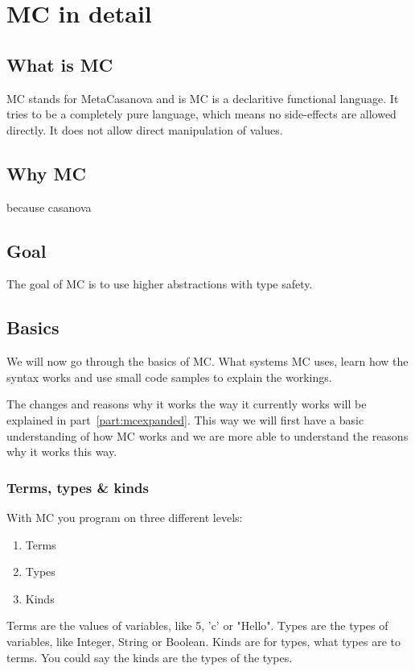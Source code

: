 \chapter{MC in detail}

\section{What is MC}
MC stands for MetaCasanova and is MC is a declaritive functional language.
It tries to be a completely pure language, which means no side-effects are allowed directly.
It does not allow direct manipulation of values.

\section{Why MC}
because casanova


\section{Goal}
The goal of MC is to use higher abstractions with type safety.

\section{Basics}
We will now go through the basics of MC.
What systems MC uses, learn how the syntax works and use small code samples to explain the workings.

The changes and reasons why it works the way it currently works will be explained in part~\ref{part:mcexpanded}.
This way we will first have a basic understanding of how MC works and we are more able to understand the reasons why it works this way.

\subsection{Terms, types \& kinds}\label{sec:basiclevels}
With MC you program on three different levels:
\begin{enumerate}[noitemsep]
   \item Terms
   \item Types
   \item Kinds
\end{enumerate}
Terms are the values of variables, like 5, 'c' or "Hello".
Types are the types of variables, like Integer, String or Boolean.
Kinds are for types, what types are to terms.
You could say the kinds are the types of the types.

